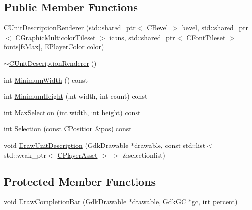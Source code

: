 \subsection*{Public Member Functions}
\begin{DoxyCompactItemize}
\item 
\hyperlink{classCUnitDescriptionRenderer_aaabf682ccd3f6b4075763657e7af33d8}{C\+Unit\+Description\+Renderer} (std\+::shared\+\_\+ptr$<$ \hyperlink{classCBevel}{C\+Bevel} $>$ bevel, std\+::shared\+\_\+ptr$<$ \hyperlink{classCGraphicMulticolorTileset}{C\+Graphic\+Multicolor\+Tileset} $>$ icons, std\+::shared\+\_\+ptr$<$ \hyperlink{classCFontTileset}{C\+Font\+Tileset} $>$ fonts\mbox{[}\hyperlink{classCUnitDescriptionRenderer_a3ea4cd83b6dd9533ab3abb953a7da35aa74218e4708bac1eab359099eb0b159b2}{fs\+Max}\mbox{]}, \hyperlink{GameDataTypes_8h_aafb0ca75933357ff28a6d7efbdd7602f}{E\+Player\+Color} color)
\item 
\hyperlink{classCUnitDescriptionRenderer_ae1e7ba8e6987507bd11bc59af961155b}{$\sim$\+C\+Unit\+Description\+Renderer} ()
\item 
int \hyperlink{classCUnitDescriptionRenderer_aed1a5ab08252a5d550d3c26dfa979962}{Minimum\+Width} () const
\item 
int \hyperlink{classCUnitDescriptionRenderer_a6899e564a8a96ba6539faee409ac93ad}{Minimum\+Height} (int width, int count) const
\item 
int \hyperlink{classCUnitDescriptionRenderer_a13289f29576ca1e55ed910aa7fef76e2}{Max\+Selection} (int width, int height) const
\item 
int \hyperlink{classCUnitDescriptionRenderer_a6ef0c9f010b5502def622e6d830795c7}{Selection} (const \hyperlink{classCPosition}{C\+Position} \&pos) const
\item 
void \hyperlink{classCUnitDescriptionRenderer_a129cfc5d3942ebc37b9ca51530bf4daa}{Draw\+Unit\+Description} (Gdk\+Drawable $\ast$drawable, const std\+::list$<$ std\+::weak\+\_\+ptr$<$ \hyperlink{classCPlayerAsset}{C\+Player\+Asset} $>$ $>$ \&selectionlist)
\end{DoxyCompactItemize}
\subsection*{Protected Member Functions}
\begin{DoxyCompactItemize}
\item 
void \hyperlink{classCUnitDescriptionRenderer_a1faaa0097504c0ccf2f8017449324377}{Draw\+Completion\+Bar} (Gdk\+Drawable $\ast$drawable, Gdk\+GC $\ast$gc, int percent)
\end{DoxyCompactItemize}
